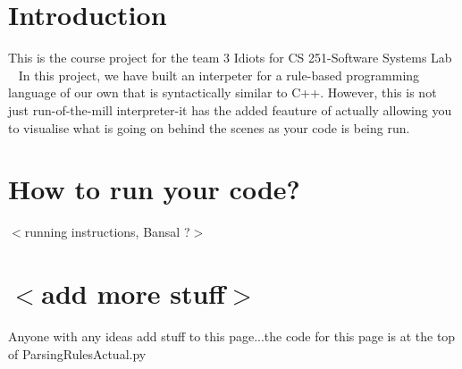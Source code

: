 \hypertarget{index_Intro_sec}{}\section{Introduction}\label{index_Intro_sec}
This is the course project for the team 3 Idiots for CS 251-\/\+Software Systems Lab ~\newline
 In this project, we have built an interpeter for a rule-\/based programming language of our own that is syntactically similar to C++. However, this is not just run-\/of-\/the-\/mill interpreter-\/it has the added feauture of actually allowing you to visualise what is going on behind the scenes as your code is being run.\hypertarget{index_running}{}\section{How to run your code?}\label{index_running}
$<$running instructions, Bansal ?$>$\hypertarget{index_tp}{}\section{$<$add more stuff$>$}\label{index_tp}
Anyone with any ideas add stuff to this page...the code for this page is at the top of Parsing\+Rules\+Actual.\+py 